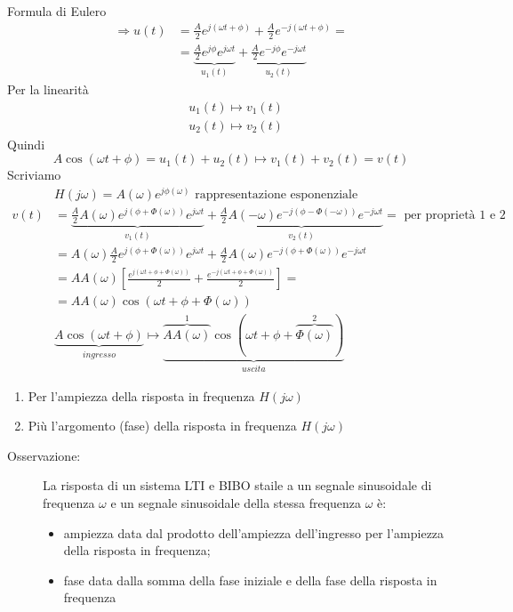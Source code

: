 \documentclass[a4paper, 12pt]{book}
\theoremstyle{plain}
\begin{document}
Formula di Eulero
\[
    \begin{split}
        \Rightarrow u(t) &= \frac{A}{2} e^{j(\omega t + \phi)} + \frac{A}{2} e^{-j(\omega t + \phi)} = \\
        &= \underbrace{\frac{A}{2} e^{j \phi} e^{j \omega t}}_{u_1(t)} + \underbrace{\frac{A}{2} e^{-j \phi} e^{-j \omega t}}_{u_2(t)}
    \end{split}
\]
Per la linearità 
\[
    \begin{split}
        &u_1(t) \mapsto v_1(t) \\
        &u_2(t) \mapsto v_2(t) 
    \end{split}
\]
Quindi 
\[
    A \cos (\omega t + \phi) = u_1(t) + u_2(t) \mapsto v_1(t) + v_2(t) = v(t)
\]
Scriviamo
\[
    \begin{split}
        &H(j \omega) = A(\omega) e^{j \phi (\omega)} \textrm{ rappresentazione esponenziale} \\
        v(t) &= \underbrace{\frac{A}{2} A(\omega) e^{j(\phi + \Phi (\omega))} e^{j \omega t}}_{v_1(t)} + \underbrace{\frac{A}{2} A(-\omega) e^{-j(\phi - \Phi (-\omega))} e^{-j \omega t}}_{v_2(t)} = \textrm{ per proprietà 1 e 2} \\
        &= A(\omega) \frac{A}{2} e^{j(\phi + \Phi (\omega))} e^{j \omega t} + \frac{A}{2} A(\omega) e^{-j(\phi + \Phi (\omega))} e^{-j \omega t} \\
        &= AA(\omega)[\frac{e^{j(\omega t + \phi + \Phi(\omega))}}{2} + \frac{e^{-j(\omega t + \phi + \Phi(\omega))}}{2}] = \\
        &= AA(\omega) \cos (\omega t + \phi + \Phi (\omega)) \\
        &\underbrace{A \cos (\omega t + \phi)}_{ingresso} \mapsto \underbrace{\overbrace{AA(\omega)}^1 \cos (\omega t + \phi + \overbrace{\Phi (\omega)}^2)}_{uscita}
    \end{split}
\]
\begin{enumerate}
    \item Per l'ampiezza della risposta in frequenza $H(j \omega)$
    \item Più l'argomento (fase) della risposta in frequenza $H(j \omega)$
\end{enumerate}
\begin{description}
    \item[Osservazione:] La risposta di un sistema LTI e BIBO staile a un segnale sinusoidale di frequenza $\omega$ e un 
    segnale sinusoidale della stessa frequenza $\omega$ è:
    \begin{itemize}
        \item ampiezza data dal prodotto dell'ampiezza dell'ingresso per l'ampiezza della risposta in frequenza;
        \item fase data dalla somma della fase iniziale e della fase della risposta in frequenza
    \end{itemize}   
\end{description}
\end{document}
